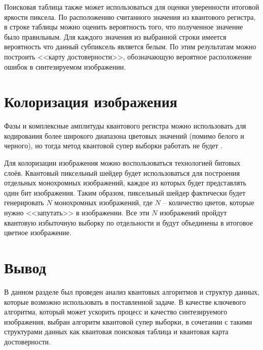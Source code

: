 Поисковая таблица также может использоваться для оценки уверенности итоговой яркости пиксела. По расположению считанного значения из квантового регистра, в строке таблицы можно оценить вероятность того, что полученное значение было правильным. Для каждого значения из выбранной строки имеется вероятность что данный субпиксель является белым. По этим результатам можно построить <<карту достоверности>>, обозначающую вероятное расположение ошибок в синтезируемом изображении.

\section{Колоризация изображения}

Фазы и комплексные амплитуды квантового регистра можно использовать для кодирования более широкого диапазона цветовых значений (помимо белого и черного), но тогда метод квантовой супер выборки работать не будет \cite{PQC}. 

Для колоризации изображения можно воспользоваться технологией битовых слоёв. Квантовый пиксельный шейдер будет использоваться для построения отдельных монохромных изображений, каждое из которых будет представлять один бит изображения. Таким образом, пиксельный шейдер фактически будет генерировать $N$ монохромных изображений, где $N$ -- количество цветов, которые нужно <<запутать>> в изображении. Все эти $N$ изображений пройдут квантовую избыточную выборку по отдельности и будут объединены в итоговое цветное изображение.

\section*{Вывод}

В данном разделе был проведен анализ квантовых алгоритмов и структур данных, которые возможно использовать в поставленной задаче. В качестве ключевого алгоритма, который может ускорить процесс и качество синтезируемого изображения, выбран алгоритм квантовой супер выборки, в сочетании с такими структурами данных как квантовая поисковая таблица и квантовая карта достоверности.